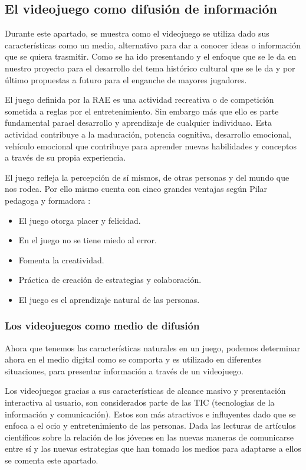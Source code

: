 \subsection{El videojuego como difusión de información}\label{juego}
Durante este apartado, se muestra como el videojuego se utiliza dado sus características como un medio, alternativo para dar a conocer ideas o información que se quiera trasmitir. Como se ha ido presentando y el enfoque que se le da en nuestro proyecto para el desarrollo del tema histórico cultural que se le da y por último propuestas a futuro para el enganche de mayores jugadores. 

El juego definida por la RAE es una actividad  recreativa o de competición sometida a reglas por el entretenimiento. Sin embargo más que ello es parte fundamental parael desarrollo y aprendizaje de cualquier individuao. Esta actividad contribuye a la maduración, potencia cognitiva, desarrollo emocional, vehículo emocional que contribuye para aprender nuevas habilidades y conceptos a través de su propia experiencia.

El juego refleja la percepción de sí mismos, de otras personas y del mundo que nos rodea. Por ello mismo cuenta con cinco grandes ventajas según Pilar pedagoga y formadora \cite{pilarjimenez2015}:
\begin{itemize}
	\item El juego otorga placer y felicidad.
	\item En el juego no se tiene miedo al error.
	\item Fomenta la creatividad.
	\item Práctica de creación de estrategias y colaboración.
	\item El juego es el aprendizaje natural de las personas.
\end{itemize}

\subsubsection{Los videojuegos como medio de difusión}
Ahora que tenemos las características naturales en un juego, podemos determinar ahora en el medio digital como se comporta y es utilizado en diferentes situaciones, para presentar información a través de un videojuego.

Los videojuegos gracias a sus características de alcance masivo y presentación interactiva al usuario, son considerados parte de las TIC (tecnologias de la información y comunicación). Estos son más atractivos e influyentes dado que se enfoca a el ocio y entretenimiento de las personas. Dada las lecturas de artículos científicos sobre la relación de los jóvenes en las nuevas maneras de comunicarse entre sí \cite{castellana2007adolescente} y las nuevas estrategias que han tomado los medios para adaptarse a ellos \cite{ignasidebofarull2005} se comenta este apartado. 

